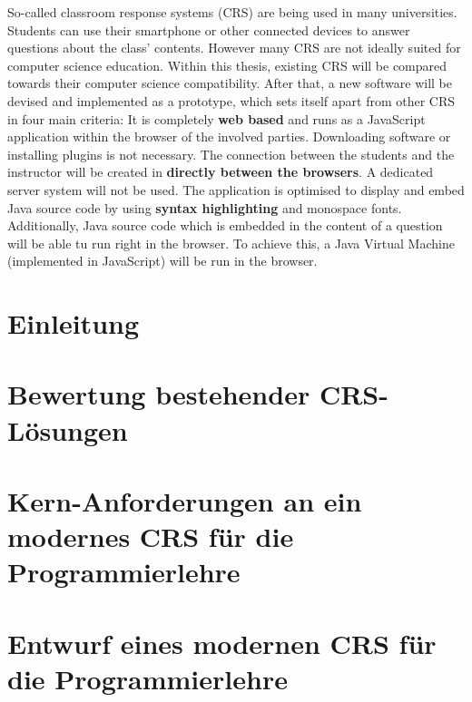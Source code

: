 \documentclass[draft=false
              ,paper=a4
              ,twoside=false
              ,fontsize=11pt
              ,headsepline
              ,BCOR=10mm
              ]{scrbook}
\begin{document}
{So-called classroom response systems (CRS) are being used in many universities. Students can use their smartphone or other connected devices to answer questions about the class' contents. However many CRS are not ideally suited for computer science education. Within this thesis, existing CRS will be compared towards their computer science compatibility. After that, a new software will be devised and implemented as a prototype, which sets itself apart from other CRS in four main criteria:\newline
It is completely \textbf{web based} and runs as a JavaScript application within the browser of the involved parties. Downloading software or installing plugins is not necessary.\newline
The connection between the students and the instructor will be created in \textbf{directly between the browsers}. A dedicated server system will not be used.\newline
The application is optimised to display and embed Java source code by using \textbf{syntax highlighting} and monospace fonts.\newline
Additionally, Java source code which is embedded in the content of a question will be able tu run right in the browser. To achieve this, a Java Virtual Machine (implemented in JavaScript) will be run in the browser.}
\newpage
\singlespacing

\setcounter{tocdepth}{3}
\tableofcontents
\newpage
\listoftables
\newpage
\listoffigures
\newpage
\lstlistoflistings
\newpage


\mainmatter
\onehalfspacing

\chapter{Einleitung}

\label{chap:einleitung}
%
\chapter{Bewertung bestehender CRS-Lösungen}
\label{chap:bewertung}

%
\chapter{Kern-Anforderungen an ein modernes CRS für die Programmierlehre}
\label{chap:anforderungen}

%
\chapter{Entwurf eines modernen CRS für die Programmierlehre}
\label{chap:entwurf}

%
\end{document}
